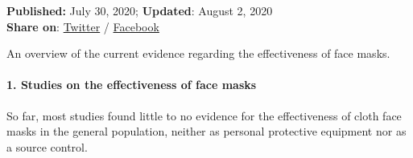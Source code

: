 \textbf{Published:} July 30, 2020; \textbf{Updated}: August 2, 2020\\
\textbf{Share on}:
\href{https://twitter.com/intent/tweet?url=https://swprs.org/face-masks-evidence/}{Twitter}
/
\href{https://www.facebook.com/share.php?u=https://swprs.org/face-masks-evidence/}{Facebook}

An overview of the current evidence regarding the effectiveness of face
masks.

\hypertarget{1-studies-on-the-effectiveness-of-face-masks}{%
\paragraph{1. Studies on the effectiveness of face
masks}\label{1-studies-on-the-effectiveness-of-face-masks}}

So far, most studies found little to no evidence for the effectiveness
of cloth face masks in the general population, neither as personal
protective equipment nor as a source control.

